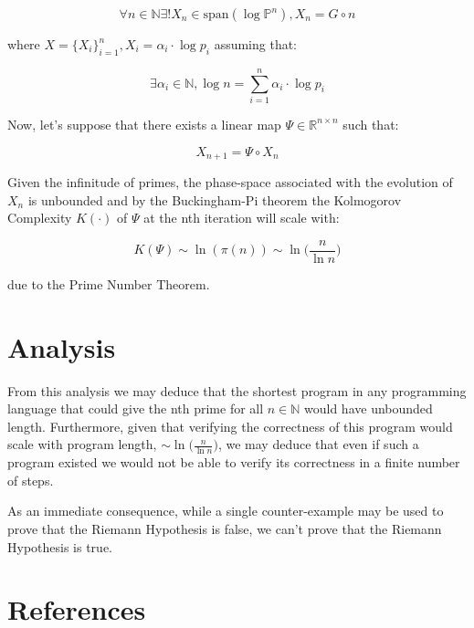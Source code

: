 \documentclass{article}
\begin{document}
\begin{equation}
\forall n \in \mathbb{N} \exists! X_n \in \text{span}(\log \mathbb{P}^n), X_n = G \circ n
\end{equation}

where $X = \{X_i\}_{i=1}^n, X_i = \alpha_i \cdot \log p_i$ assuming that:

\begin{equation}
\exists \alpha_i \in \mathbb{N}, \log n = \sum_{i=1}^n \alpha_i \cdot \log p_i
\end{equation}

Now, let's suppose that there exists a linear map $\Psi \in \mathbb{R}^{n \times n}$ such that:

\begin{equation}
X_{n+1} = \Psi \circ X_n
\end{equation}

Given the infinitude of primes, the phase-space associated with the evolution of $X_n$ is unbounded and by the Buckingham-Pi
theorem the Kolmogorov Complexity $K(\cdot)$ of $\Psi$ at the nth iteration will scale with:

\begin{equation}
K(\Psi) \sim \ln(\pi(n)) \sim \ln \big(\frac{n}{\ln n}\big)
\end{equation}

due to the Prime Number Theorem.

\newpage

\section{Analysis}

From this analysis we may deduce that the shortest program in any programming language that could give the nth prime for all $n \in \mathbb{N}$ would have unbounded length. Furthermore, given that verifying the correctness of this program would scale with program length, $ \sim \ln \big(\frac{n}{\ln n}\big)$, we may deduce that even if such a program existed we would not be able to verify its correctness in a finite number of steps. 

As an immediate consequence, while a single counter-example may be used to prove that the Riemann Hypothesis is false, we can’t prove that the Riemann Hypothesis is true.

\section*{References}
\end{document}

